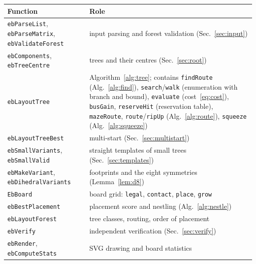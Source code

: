 \documentclass[11pt,a4paper]{article}
\theoremstyle{remark}
\begin{document}
\begingroup\centering
\small
\begin{tabularx}{\textwidth}{@{}lX@{}}
\toprule
Function & Role \\
\midrule
\texttt{ebParseList}, \texttt{ebParseMatrix}, \texttt{ebValidateForest} & input parsing and forest validation (Sec.~\ref{sec:input}) \\
\texttt{ebComponents}, \texttt{ebTreeCentre} & trees and their centres (Sec.~\ref{sec:root}) \\
\texttt{ebLayoutTree} & Algorithm~\ref{alg:tree}; contains \texttt{findRoute} (Alg.~\ref{alg:find}), \texttt{search}/\texttt{walk}
  (enumeration with branch and bound), \texttt{evaluate} (cost~\eqref{eq:cost}), \texttt{busGain}, \texttt{reserveHit}
  (reservation table), \texttt{mazeRoute}, \texttt{route}/\texttt{ripUp} (Alg.~\ref{alg:route}), \texttt{squeeze}
  (Alg.~\ref{alg:squeeze}) \\
\texttt{ebLayoutTreeBest} & multi-start (Sec.~\ref{sec:multistart}) \\
\texttt{ebSmallVariants}, \texttt{ebSmallValid} & straight templates of small trees (Sec.~\ref{sec:templates}) \\
\texttt{ebMakeVariant}, \texttt{ebDihedralVariants} & footprints and the eight symmetries (Lemma~\ref{lem:d8}) \\
\texttt{EbBoard} & board grid: \texttt{legal}, \texttt{contact}, \texttt{place}, \texttt{grow} \\
\texttt{ebBestPlacement} & placement score and nestling (Alg.~\ref{alg:nestle}) \\
\texttt{ebLayoutForest} & tree classes, routing, order of placement \\
\texttt{ebVerify} & independent verification (Sec.~\ref{sec:verify}) \\
\texttt{ebRender}, \texttt{ebComputeStats} & SVG drawing and board statistics \\
\bottomrule
\end{tabularx}\par\endgroup
\end{document}
